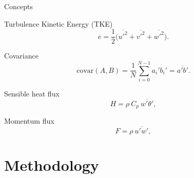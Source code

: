 \documentclass{beamer}
\begin{document}
\begin{frame}{Concepts}

\begin{block}{Turbulence Kinetic Energy (TKE)}
\begin{equation}
    e = \frac{1}{2} \big(\overline{u'^2} + \overline{v'^2} + \overline{w'^2}\big). 
    \label{eq:tke}
\end{equation}
\end{block}

\begin{block}{Covariance}
\begin{equation}
    \text{covar}(A,B) = \frac{1}{N}\sum_{i=0}^{N-1} a_i' b_i'= \overline{a'b'}.
\end{equation}
\end{block}

\begin{block}{Sensible heat flux}
\begin{equation}
    H = \rho \ C_p \ \overline{w'\theta'},
\end{equation}
\end{block}

\begin{block}{Momentum flux}
\begin{equation}
    F = \rho \ \overline{u'w'}, 
\end{equation}
\end{block}

\end{frame}


\section{Methodology}
\end{document}
